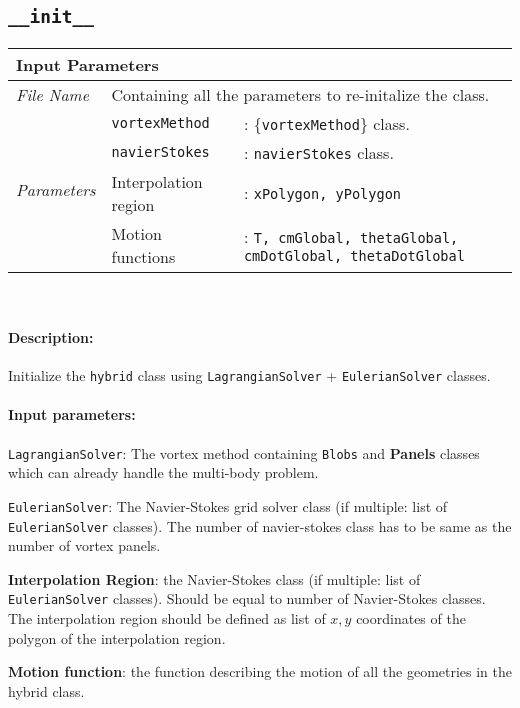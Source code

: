\subsection*{\texttt{\_\_init\_\_}}
	\begin{tabular}{l|lp{7cm}}
		\multicolumn{2}{l}{\textbf{Input Parameters}} & \\ \hline
		\textit{File Name} & \multicolumn{2}{l}{Containing all the parameters to re-initalize the class.} \\ \hline
		\multirow{4}{*}{\textit{Parameters}} & \texttt{vortexMethod} &: \{\texttt{vortexMethod}\} class.\\ \cline{2-3}
		& \texttt{navierStokes} &: \texttt{navierStokes} class. \\ \cline{2-3}
		& Interpolation region &: \texttt{xPolygon, yPolygon}\\ \cline{2-3}
		& Motion functions &: \texttt{T, cmGlobal, thetaGlobal, cmDotGlobal, thetaDotGlobal}\\ \cline{2-3}
	\end{tabular}\\
	
	\paragraph{Description:} Initialize the \texttt{hybrid} class using \texttt{LagrangianSolver} + \texttt{EulerianSolver} classes.
	\paragraph{Input parameters:}
	\begin{list}{\quad}{}
	\item \texttt{LagrangianSolver}: The vortex method containing \texttt{Blobs} and \textbf{Panels} classes which can already handle the multi-body problem.
	\item \texttt{EulerianSolver}: The Navier-Stokes grid solver class (if multiple: list of \texttt{EulerianSolver} classes). The number of navier-stokes class has to be same as the number of vortex panels.
	\item \textbf{Interpolation Region}: the Navier-Stokes class (if multiple: list of \texttt{EulerianSolver} classes). Should be equal to number of Navier-Stokes classes. The interpolation region should be defined as list of $x,y$ coordinates of the polygon of the interpolation region.
	\item \textbf{Motion function}: the function describing the motion of all the geometries in the hybrid class.
	\end{list}
	

